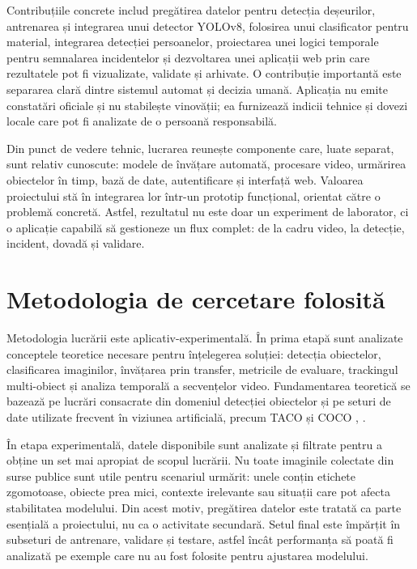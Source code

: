 Contribuțiile concrete includ pregătirea datelor pentru detecția deșeurilor, antrenarea și integrarea unui detector YOLOv8, folosirea unui clasificator pentru material, integrarea detecției persoanelor, proiectarea unei logici temporale pentru semnalarea incidentelor și dezvoltarea unei aplicații web prin care rezultatele pot fi vizualizate, validate și arhivate. O contribuție importantă este separarea clară dintre sistemul automat și decizia umană. Aplicația nu emite constatări oficiale și nu stabilește vinovății; ea furnizează indicii tehnice și dovezi locale care pot fi analizate de o persoană responsabilă.

Din punct de vedere tehnic, lucrarea reunește componente care, luate separat, sunt relativ cunoscute: modele de învățare automată, procesare video, urmărirea obiectelor în timp, bază de date, autentificare și interfață web. Valoarea proiectului stă în integrarea lor într-un prototip funcțional, orientat către o problemă concretă. Astfel, rezultatul nu este doar un experiment de laborator, ci o aplicație capabilă să gestioneze un flux complet: de la cadru video, la detecție, incident, dovadă și validare.

\section*{Metodologia de cercetare folosită}
{}

Metodologia lucrării este aplicativ-experimentală. În prima etapă sunt analizate conceptele teoretice necesare pentru înțelegerea soluției: detecția obiectelor, clasificarea imaginilor, învățarea prin transfer, metricile de evaluare, trackingul multi-obiect și analiza temporală a secvențelor video. Fundamentarea teoretică se bazează pe lucrări consacrate din domeniul detecției obiectelor și pe seturi de date utilizate frecvent în viziunea artificială, precum TACO și COCO \cite{proenca2020taco}, \cite{lin2014microsoft}.

În etapa experimentală, datele disponibile sunt analizate și filtrate pentru a obține un set mai apropiat de scopul lucrării. Nu toate imaginile colectate din surse publice sunt utile pentru scenariul urmărit: unele conțin etichete zgomotoase, obiecte prea mici, contexte irelevante sau situații care pot afecta stabilitatea modelului. Din acest motiv, pregătirea datelor este tratată ca parte esențială a proiectului, nu ca o activitate secundară. Setul final este împărțit în subseturi de antrenare, validare și testare, astfel încât performanța să poată fi analizată pe exemple care nu au fost folosite pentru ajustarea modelului.

